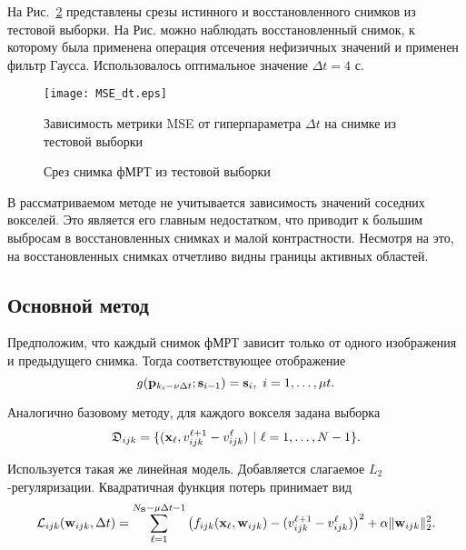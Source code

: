 \documentclass[a4paper, 12pt]{article}
\begin{document}
	На Рис.~\ref*{fig:1} представлены срезы истинного и восстановленного снимков из 
	тестовой выборки. На Рис. можно наблюдать восстановленный снимок, к 
	которому была применена операция отсечения нефизичных значений и применен фильтр Гаусса.
	Использовалось оптимальное значение $\Delta t = 4 \text{ с}$.

	\begin{figure}[h!]
		\centering
		\texttt{[image: MSE\_dt.eps]}
		\caption{Зависимость метрики MSE от гиперпараметра $\Delta t$ на снимке из тестовой выборки}
		\label{fig:2}
	\end{figure}

	\begin{figure}[h!]
		\centering
		\hfill
		\hfill
		\caption{Срез снимка фМРТ из тестовой выборки}
		\label{fig:1}
	\end{figure}
	
	В рассматриваемом методе не учитывается зависимость значений соседних вокселей.
	Это является его главным недостатком, что приводит к большим выбросам в восстановленных снимках
	и малой контрастности. Несмотря на это, на восстановленных снимках отчетливо видны границы
	активных областей.

\subsection{Основной метод}

	Предположим, что каждый снимок фМРТ зависит только от одного изображения и предыдущего снимка.
	Тогда соответствующее отображение
	\begin{equation}
		\label{eq15}
		g(\mathbf{p}_{k_i - \nu \Delta t}; \mathbf{s}_{i-1}) = \mathbf{s}_i, \ i = 1, \ldots, \mu t.
	\end{equation}

	Аналогично базовому методу, для каждого вокселя задана выборка
	\[ \mathfrak{D}_{ijk} = \{(\mathbf{x}_{\ell}, v^{\ell + 1}_{ijk} - v^{\ell}_{ijk}) \ | \ {\ell} = 1, \ldots, N-1 \}. \]

	Используется такая же линейная модель. Добавляется слагаемое $L_2$-регуляризации. 
	Квадратичная функция потерь принимает вид
	\begin{equation}
		\label{eq16}
		\mathcal{L}_{ijk}(\mathbf{w}_{ijk}, \Delta t) = \sum\limits_{\ell = 1}^{N_{\mathbf{S}} - \mu \Delta t - 1} \big(f_{ijk}(\mathbf{x}_{\ell}, \mathbf{w}_{ijk}) - (v^{\ell + 1}_{ijk} - v^{\ell}_{ijk})\big)^2 + \alpha \| \mathbf{w}_{ijk} \|_2^2.
	\end{equation}
\end{document}
